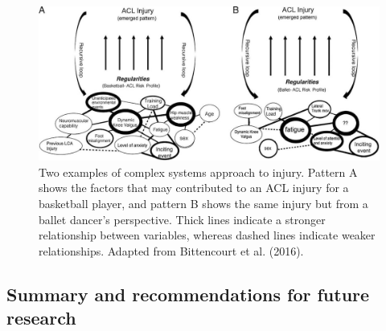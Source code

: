 \documentclass[
  english,
  man,floatsintext]{apa6}
\begin{document}
\begin{figure}

{\centering \includegraphics[width=1\linewidth]{figs/measures/wob} 

}

\caption{Two examples of complex systems approach to injury. Pattern A shows the factors that may contributed to an ACL injury for a basketball player, and pattern B shows the same injury but from a ballet dancer's perspective. Thick lines indicate a stronger relationship between variables, whereas dashed lines indicate weaker relationships. Adapted from Bittencourt et al. (2016).}\label{fig:web}
\end{figure}

\hypertarget{summary-and-recommendations-for-future-research}{%
\subsection{Summary and recommendations for future research}\label{summary-and-recommendations-for-future-research}}
\end{document}
